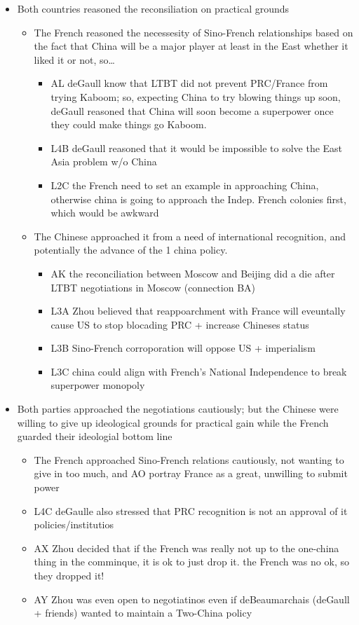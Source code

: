 \documentclass[letterpaper]{article}
\begin{document}
\begin{itemize}
\item Both countries reasoned the reconsiliation on practical grounds

\begin{itemize}
\item The French reasoned the necessesity of Sino-French relationships
based on the fact that China will be a major player at least in the
East whether it liked it or not, so\ldots{}

\begin{itemize}
\item AL deGaull know that LTBT did not prevent PRC/France from trying
Kaboom; so, expecting China to try blowing things up soon, deGaull
reasoned that China will soon become a superpower once they could
make things go Kaboom.
\item L4B deGaull reasoned that it would be impossible to solve the East
Asia problem w/o China
\item L2C the French need to set an example in approaching China,
otherwise china is going to approach the Indep. French colonies
first, which would be awkward
\end{itemize}

\item The Chinese approached it from a need of international recognition,
and potentially the advance of the 1 china policy.

\begin{itemize}
\item AK the reconciliation between Moscow and Beijing did a die after
LTBT negotiations in Moscow (connection BA)
\item L3A Zhou believed that reappoarchment with France will eveuntally
cause US to stop blocading PRC + increase Chineses status
\item L3B Sino-French corroporation will oppose US + imperialism
\item L3C china could align with French's National Independence to break
superpower monopoly
\end{itemize}
\end{itemize}

\item Both parties approached the negotiations cautiously; but the Chinese
were willing to give up ideological grounds for practical gain while
the French guarded their ideologial bottom line

\begin{itemize}
\item The French approached Sino-French relations cautiously, not wanting
to give in too much, and AO portray France as a great, unwilling to
submit power
\item L4C deGaulle also stressed that PRC recognition is not an approval
of it policies/institutios
\item AX Zhou decided that if the French was really not up to the
one-china thing in the comminque, it is ok to just drop it. the
French was no ok, so they dropped it!
\item AY Zhou was even open to negotiatinos even if deBeaumarchais
(deGaull + friends) wanted to maintain a Two-China policy
\end{itemize}
\end{itemize}
\end{document}
